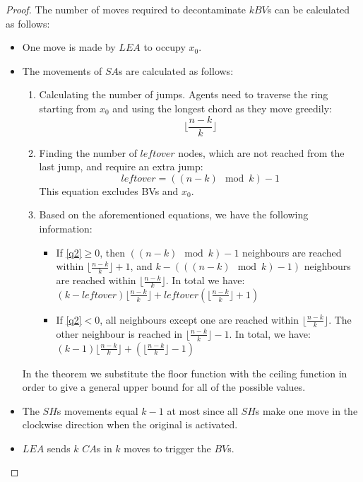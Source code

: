 \begin{proof}
The number of moves required to decontaminate $k BV$s can be calculated as follows:
\begin{itemize}
\item One move is made by $LEA$ to occupy $x_{0}$.
\item The movements of $SA$s are calculated as follows:
\begin{enumerate}
  \item Calculating the number of jumps. Agents need to traverse the ring starting from $x_{0}$ and using the longest chord as they move greedily: \begin{equation}\label{q1}
\lfloor \frac {n-k}{k} \rfloor 
\end {equation}
  \item Finding the number of $leftover$ nodes, which are not reached from the last jump, and require an extra jump:
 \begin{equation}\label{q2}
leftover=((n-k)\mod k ) -1 
\end {equation}   
This equation excludes BVs and $x_{0}$.
  
  \item Based on the aforementioned equations, we have the following information: 
\begin{itemize}

\item If \ref{q2}$\ge 0$, then $((n-k)\mod k ) -1$  neighbours are reached within $\lfloor \frac {n-k}{k} \rfloor  +1$,  
and $k- ( ((n-k)\mod k ) -1)$ neighbours are reached within $\lfloor \frac {n-k}{k} \rfloor  $. In total we have: \\
$(k- leftover) \lfloor \frac {n-k}{k} \rfloor + leftover (\lfloor \frac {n-k}{k} \rfloor  +1)$
\item If \ref{q2}$< 0 $, all neighbours except one are reached within $\lfloor \frac {n-k}{k} \rfloor $. The other neighbour is reached in $\lfloor \frac {n-k}{k} \rfloor -1$. In total, we have: \\
$(k-1)\lfloor \frac {n-k}{k} \rfloor + (\lfloor \frac {n-k}{k} \rfloor -1)$
\end {itemize}
\end{enumerate}
In the theorem we substitute the floor function with the ceiling function in order to give a general upper bound for all of the possible values.

\item The $SH$s movements equal $k-1$  at most since all $SH$s make one move in the clockwise direction when the original \bv is activated.
\item $LEA$ sends $k$ $CA$s in $k$ moves to trigger the $BV$s.


\end{itemize}
\end{proof}
